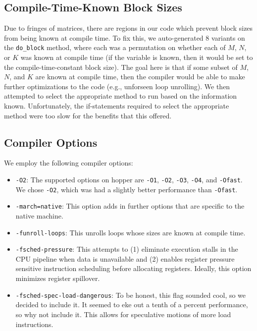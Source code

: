 \documentclass{article} %
\begin{document}
\subsection{Compile-Time-Known Block Sizes}
Due to fringes of matrices, there are regions in our code which prevent block
sizes from being known at compile time. To fix this, we auto-generated $8$
variants on the \texttt{do\_block} method, where each was a permutation on whether
each of $M$, $N$, or $K$ was known at compile time (if the variable is known, then
it would be set to the compile-time-constant block size). The goal here is that
if some subset of $M$, $N$, and $K$ are known at compile time, then the compiler
would be able to make further optimizations to the code (e.g., unforseen loop
unrolling). We then attempted to
select the appropriate method to run based on the information known.
Unfortunately, the if-statements required to select the appropriate method were
too slow for the benefits that this offered.

\subsection{Compiler Options}
We employ the following compiler options:
\begin{itemize}
  \item \texttt{-O2}: The supported options on hopper are \texttt{-O1}, \texttt{-O2},
    \texttt{-O3}, \texttt{-O4}, and \texttt{-Ofast}.
    We chose \texttt{-O2}, which was had a slightly better performance than \texttt{-Ofast}.
  \item \texttt{-march=native}: This option adds in further options that are
    specific to the native machine.
  \item \texttt{-funroll-loops}: This unrolls loops whose sizes are known at
    compile time.
  \item \texttt{-fsched-pressure}: This attempts to (1) eliminate execution
    stalls in the CPU pipeline when data is unavailable and (2) enables register
    pressure sensitive instruction scheduling before allocating registers.
    Ideally, this option minimizes register spillover.
  \item \texttt{-fsched-spec-load-dangerous}: To be honest, this flag sounded
    cool, so we decided to include it. It seemed to eke out a tenth of a percent
    performance, so why not include it. This allows for speculative motions of
    more load instructions.
\end{itemize}
\end{document}
